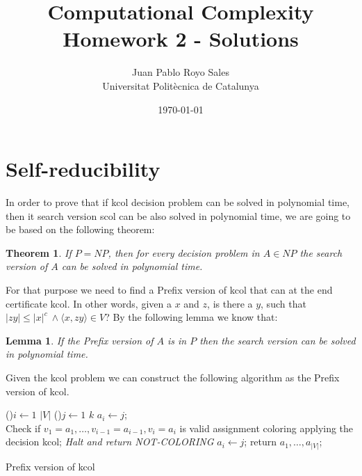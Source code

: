 \documentclass[12pt, a4paper]{article}
\title{%
  Computational Complexity \\
  Homework 2 - Solutions
}
\author{%
  Juan Pablo Royo Sales\\
  \small{Universitat Politècnica de Catalunya}
}
\date\today
\begin{document}
\maketitle

\section{Self-reducibility}

In order to prove that if \acrfull{kcol} decision problem can be solved in polynomial time, then it search version \acrfull{scol} can be also solved in polynomial time, we are going to be based on the following theorem:

\newtheorem{searchpnp}{Theorem}
\begin{searchpnp}
  If $P = NP$, then for every decision problem in $A \in NP$ the search version of $A$ can be solved in polynomial time.
\end{searchpnp}

For that purpose we need to find a Prefix version of \acrshort{kcol} that can at the end certificate \acrshort{kcol}\@. In other words, given a $x$ and $z$, is there a $y$, such that $|zy| \leq |x|^c\ \land \langle x,zy \rangle \in V$?
By the following lemma we know that:

\newtheorem{lemmasearch}{Lemma}
\begin{lemmasearch}
  If the Prefix version of $A$ is in $P$ then the search version can be solved in polynomial time.
\end{lemmasearch}

Given the \acrshort{kcol} problem we can construct the following algorithm as the Prefix version of \acrshort{kcol}.

\begin{algorithm}[H]
  \For(){$i \leftarrow 1$ \KwTo $|V|$}
  {\For(){$j \leftarrow 1$ \KwTo $k$}
    {$a_i \leftarrow j$; \\
      Check if $v_1 = a_1, \dots, v_{i-1} = a_{i-1}, v_i = a_i$ is valid assignment coloring applying the decision \acrshort{kcol};\label{polytime}
    }
    {\emph{Halt and return NOT-COLORING}
    }
    {$a_i \leftarrow j$; }
  }
  return $a_1,\dots,a_{|V|}$;
  \caption{Prefix version of \acrshort{kcol}}
\end{algorithm}
\end{document}
